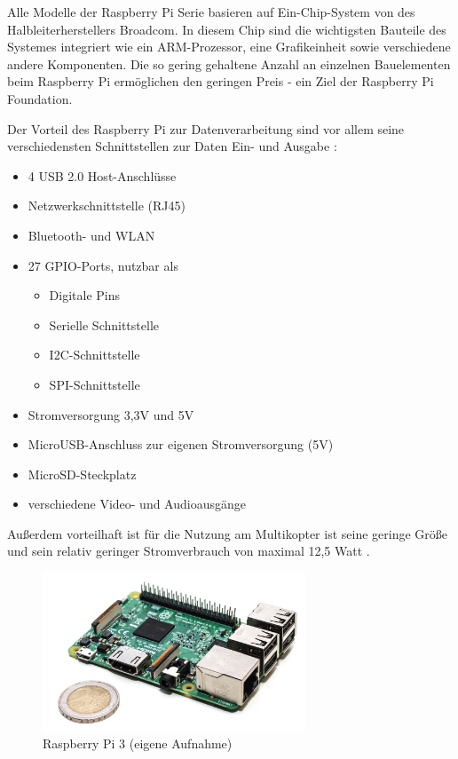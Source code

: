 \documentclass[a4paper,12pt,bibliography=totoc, listof=totoc,titlepage,pointlessnumbers]{scrreprt}
\begin{document}
Alle Modelle der Raspberry Pi Serie basieren auf Ein-Chip-System von des Halbleiterherstellers Broadcom. In diesem Chip sind die wichtigsten Bauteile des Systemes integriert wie ein ARM-Prozessor, eine Grafikeinheit sowie verschiedene andere Komponenten. Die so gering gehaltene Anzahl an einzelnen Bauelementen beim Raspberry Pi ermöglichen den geringen Preis - ein Ziel der Raspberry Pi Foundation.

Der Vorteil des Raspberry Pi zur Datenverarbeitung sind vor allem seine verschiedensten Schnittstellen zur Daten Ein- und Ausgabe \citep{raspSheet}:
\begin{itemize}
 \item 4 USB 2.0 Host-Anschlüsse
 \item Netzwerkschnittstelle (RJ45)
 \item Bluetooth- und WLAN
 \item 27 GPIO-Ports, nutzbar als \citep{ekRaspPin}
 \begin{itemize} 
  \item Digitale Pins
  \item Serielle Schnittstelle
  \item I2C-Schnittstelle
  \item SPI-Schnittstelle
 \end{itemize}
 \item Stromversorgung 3,3V und 5V
 \item MicroUSB-Anschluss zur eigenen Stromversorgung (5V)
 \item MicroSD-Steckplatz 
 \item verschiedene Video- und Audioausgänge
 \end{itemize}

Außerdem vorteilhaft ist für die Nutzung am Multikopter ist seine geringe 
Größe und sein relativ geringer Stromverbrauch von maximal 12,5 
Watt \citep{raspSheet}.

\begin{figure}[ht!]
 \centering
 \includegraphics[width=0.7\textwidth]{./img/rpi3.jpg}
 \caption{Raspberry Pi 3 (eigene Aufnahme)}
 \label{img:rpi3}
\end{figure}
\end{document}
